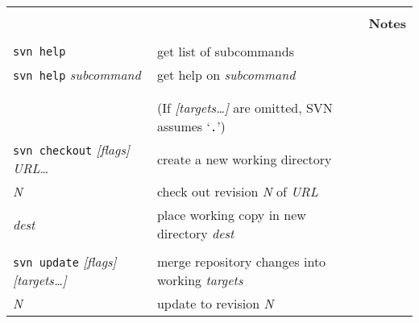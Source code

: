 \documentclass{report}
\begin{document}
\hspace{-0.7in}
\begin{tabular}{lp{2.8in}p{2.0in}}
\vspace{0.1in} \hspace{-0.1in}{\bf\LARGE SVN Quick Reference}   &
						& \\

						&
						&
\multicolumn{1}{c}{\bf\Large Notes}              \\ \cline{3-3}

\vspace{0.1in} \hspace{-0.1in}{\bf\Large Getting Help}   &
                                                &  \\

{\tt svn help}	                      		&
get list of subcommands                         &  \\

{\tt svn help} {\sl subcommand}  		&
get help on {\sl subcommand}			&  \\


\\
\\
\vspace{0.1in} \hspace{-0.1in}{\bf\Large Working Copies}   &
(If {\sl [targets\dots]} are omitted, SVN assumes `{\tt .}') &  \\

{\tt svn checkout} {\sl [flags]} {\sl URL}\dots &
create a new working directory			&  \\

\hspace{0.5in}{\tt -r} {\sl N}		&
check out revision {\sl N} of {\sl URL}	&  \\
\hspace{0.5in}{\tt -d} {\sl dest}		&
place working copy in new directory {\sl dest}	&  \\

\\
{\tt svn update} {\sl [flags]} {\sl [targets\dots]}	&
merge repository changes into working {\sl targets}	&  \\

\hspace{0.5in}{\tt -r} {\sl N}		&
update to revision {\sl N}		&  \\


\end{tabular}
\end{document}
